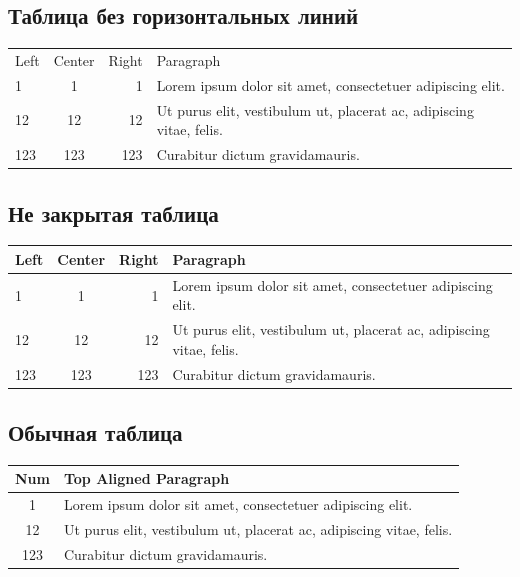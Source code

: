 \documentclass{article}
\begin{document}
\subsection{Таблица без горизонтальных линий}
\begin{tabular}{||l|c|r|p{6cm}||}
    Left & Center & Right & Paragraph \\
    1 & 1 & 1 & Lorem ipsum dolor sit amet, consectetuer adipiscing elit. \\
    12 & 12 & 12 & Ut purus elit, vestibulum ut, placerat ac, adipiscing vitae, felis. \\
    123 & 123 & 123 & Curabitur dictum gravidamauris. \\
\end{tabular}

\subsection{Не закрытая таблица}
\begin{tabular}{||l|c|r|p{6cm}||}
    \cline{1-3}
    Left & Center & Right & Paragraph \\
    \hline \hline
    1 & 1 & 1 & Lorem ipsum dolor sit amet, consectetuer adipiscing elit. \\
    \hline
    12 & 12 & 12 & Ut purus elit, vestibulum ut, placerat ac, adipiscing vitae, felis. \\
    \hline
    123 & 123 & 123 & Curabitur dictum gravidamauris. \\ [.3cm]
    \cline{4-4}
\end{tabular}

\subsection{Обычная таблица}
\begin{tabular}{|c|p{6cm}|}
    \hline
    Num & Top Aligned Paragraph\\
    \hline
    1 & Lorem ipsum dolor sit amet, consectetuer adipiscing elit. \\
    \hline
    12 & Ut purus elit, vestibulum ut, placerat ac, adipiscing vitae, felis. \\
    \hline
    123 & Curabitur dictum gravidamauris. \\
    \hline
\end{tabular}
\end{document}
